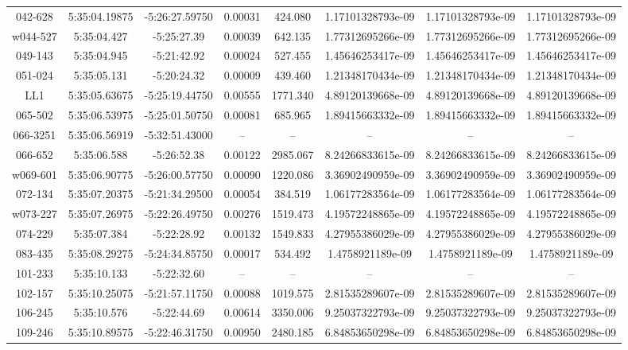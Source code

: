 \begin{table}
\begin{tabular}{cccccccc}
042-628 & 5:35:04.19875 & -5:26:27.59750 & 0.00031 & 424.080 & 1.17101328793e-09 & 1.17101328793e-09 & 1.17101328793e-09 \\
w044-527 & 5:35:04.427 & -5:25:27.39 & 0.00039 & 642.135 & 1.77312695266e-09 & 1.77312695266e-09 & 1.77312695266e-09 \\
049-143 & 5:35:04.945 & -5:21:42.92 & 0.00024 & 527.455 & 1.45646253417e-09 & 1.45646253417e-09 & 1.45646253417e-09 \\
051-024 & 5:35:05.131 & -5:20:24.32 & 0.00009 & 439.460 & 1.21348170434e-09 & 1.21348170434e-09 & 1.21348170434e-09 \\
LL1 & 5:35:05.63675 & -5:25:19.44750 & 0.00555 & 1771.340 & 4.89120139668e-09 & 4.89120139668e-09 & 4.89120139668e-09 \\
065-502 & 5:35:06.53975 & -5:25:01.50750 & 0.00081 & 685.965 & 1.89415663332e-09 & 1.89415663332e-09 & 1.89415663332e-09 \\
066-3251 & 5:35:06.56919 & -5:32:51.43000 & -- & -- & -- & -- & -- \\
066-652 & 5:35:06.588 & -5:26:52.38 & 0.00122 & 2985.067 & 8.24266833615e-09 & 8.24266833615e-09 & 8.24266833615e-09 \\
w069-601 & 5:35:06.90775 & -5:26:00.57750 & 0.00090 & 1220.086 & 3.36902490959e-09 & 3.36902490959e-09 & 3.36902490959e-09 \\
072-134 & 5:35:07.20375 & -5:21:34.29500 & 0.00054 & 384.519 & 1.06177283564e-09 & 1.06177283564e-09 & 1.06177283564e-09 \\
w073-227 & 5:35:07.26975 & -5:22:26.49750 & 0.00276 & 1519.473 & 4.19572248865e-09 & 4.19572248865e-09 & 4.19572248865e-09 \\
074-229 & 5:35:07.384 & -5:22:28.92 & 0.00132 & 1549.833 & 4.27955386029e-09 & 4.27955386029e-09 & 4.27955386029e-09 \\
083-435 & 5:35:08.29275 & -5:24:34.85750 & 0.00017 & 534.492 & 1.4758921189e-09 & 1.4758921189e-09 & 1.4758921189e-09 \\
101-233 & 5:35:10.133 & -5:22:32.60 & -- & -- & -- & -- & -- \\
102-157 & 5:35:10.25075 & -5:21:57.11750 & 0.00088 & 1019.575 & 2.81535289607e-09 & 2.81535289607e-09 & 2.81535289607e-09 \\
106-245 & 5:35:10.576 & -5:22:44.69 & 0.00614 & 3350.006 & 9.25037322793e-09 & 9.25037322793e-09 & 9.25037322793e-09 \\
109-246 & 5:35:10.89575 & -5:22:46.31750 & 0.00950 & 2480.185 & 6.84853650298e-09 & 6.84853650298e-09 & 6.84853650298e-09 \\

\end{tabular}
\end{table}
